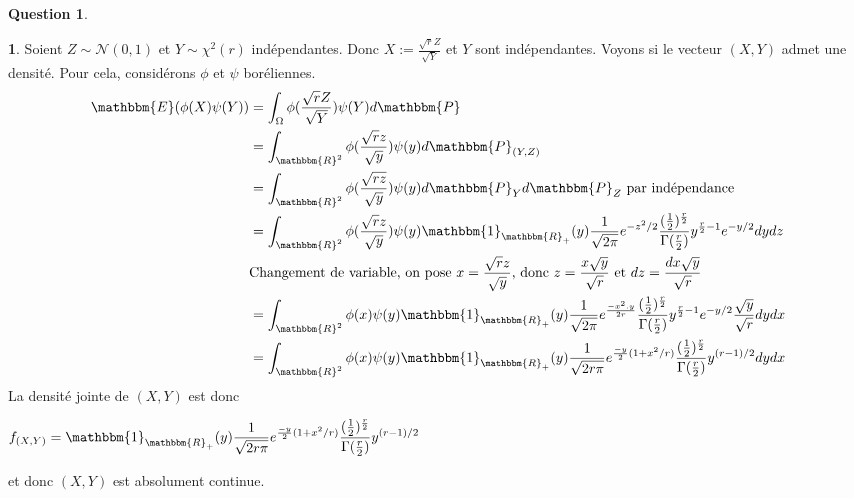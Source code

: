 \documentclass[12pt]{article}
\newcommand{\R}{\mathbbm{R}}
\newcommand{\1}{\mathbbm{1}}
\newcommand{\E}{\mathbbm{E}}
\newcommand{\Prob}{\mathbbm{P}}
\newcommand{\Nc}{\mathcal{N}}
\theoremstyle{definition}\newtheorem{defn}{Définition}
\theoremstyle{definition}\newtheorem{exm}{Exemple}
\theoremstyle{definition}\newtheorem{rem}{Remarque}
\theoremstyle{definition}\newtheorem{algo}{Algorithme}
\theoremstyle{remark}\newtheorem{exo}{Exercice}
\theoremstyle{remark}\newtheorem{nota}{Notation}
\theoremstyle{definition}\newtheorem{1q}{Question}
\theoremstyle{definition}\newtheorem{2q}{Question}
\theoremstyle{definition}\newtheorem{3q}{Question}
\theoremstyle{definition}\newtheorem{4q}{Question}
\theoremstyle{definition}\newtheorem{2qs1}{}
\theoremstyle{definition}\newtheorem{2qs2}{}
\theoremstyle{definition}\newtheorem{2qs3}{}
\theoremstyle{definition}\newtheorem{2qs4}{}
\theoremstyle{definition}\newtheorem{4qs2}{}
\theoremstyle{definition}\newtheorem{4qs3}{}
\begin{document}
\begin{2q}

\begin{2qs4}
Soient $Z\sim\Nc(0,1)$ et $Y\sim\chi^2(r)$ indépendantes. Donc $X:=\displaystyle\frac{\sqrt{r}Z}{\sqrt{Y}}$ et $Y$ sont indépendantes. Voyons si le vecteur $(X,Y)$ admet une densité. Pour cela, considérons $\phi$ et $\psi$ boréliennes.
\begin{align*}
\E(\phi(X)\psi(Y)) &=\displaystyle \int_{\Omega}\phi(\frac{\sqrt{r}Z}{\sqrt{Y}})\psi(Y)d\Prob\\
&=\displaystyle \int_{\R^2}\phi(\frac{\sqrt{r}z}{\sqrt{y}})\psi(y)d\Prob_{(Y,Z)}\\
&=\displaystyle \int_{\R^2}\phi(\frac{\sqrt{rz}}{\sqrt{y}})\psi(y)d\Prob_Yd\Prob_Z \text{  par indépendance}\\
&=\displaystyle \int_{\R^2}\phi(\frac{\sqrt{r}z}{\sqrt{y}})\psi(y)\1_{\R_+}(y)\frac{1}{\sqrt{2\pi}}e^{-z^2/2}\frac{( \frac{1}{2})^{ \frac{r}{2}}}{\Gamma( \frac{r}{2})}y^{ \frac{r}{2} - 1}e^{-y/2}dydz\\
& \text{Changement de variable, on pose $x=\frac{\sqrt{r}z}{\sqrt{y}}$, donc $z=\frac{x\sqrt{y}}{\sqrt{r}}$ et $dz =\frac{dx\sqrt{y}}{\sqrt{r}}$}\\
&=\displaystyle \int_{\R^2}\phi(x)\psi(y)\1_{\R_+}(y)\frac{1}{\sqrt{2\pi}}e^{\frac{-x^2.y}{2r}}\frac{( \frac{1}{2})^{ \frac{r}{2}}}{\Gamma( \frac{r}{2})}y^{ \frac{r}{2} - 1}e^{-y/2}\frac{\sqrt{y}}{\sqrt{r}}dydx\\
&=\displaystyle \int_{\R^2}\phi(x)\psi(y)\1_{\R_+}(y)\frac{1}{\sqrt{2r\pi}}e^{\frac{-y}{2}(1+x^2/r)}\frac{( \frac{1}{2})^{ \frac{r}{2}}}{\Gamma( \frac{r}{2})}y^{(r-1)/2}dydx\\
\end{align*}
La densité jointe de $(X,Y)$ est donc
\begin{center} $\displaystyle f_{(X,Y)} = \1_{\R_+}(y)\frac{1}{\sqrt{2r\pi}}e^{\frac{-y}{2}(1+x^2/r)}\frac{(\frac{1}{2})^{\frac{r}{2}}}{\Gamma(\frac{r}{2})}y^{(r-1)/2}$\end{center}
et donc $(X,Y)$ est absolument continue.
\end{2qs4}


\end{2q}
\end{document}
